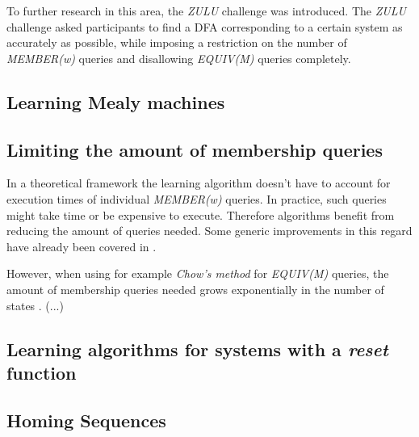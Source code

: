 \documentclass[multi,crop=false,class=article]{standalone}
\begin{document}
To further research in this area, the \textit{ZULU} challenge was introduced.
The \textit{ZULU} challenge asked participants to find a DFA corresponding
to a certain system as accurately as possible, while imposing a restriction
on the number of \textit{MEMBER(w)} queries and disallowing \textit{EQUIV(M)}
queries completely.

\subsection{Learning Mealy machines}

\subsection{Limiting the amount of membership queries}
In a theoretical framework the learning algorithm doesn't have to account
for execution times of individual \textit{MEMBER(w)} queries.
In practice, such queries might take time or be expensive to execute.
Therefore algorithms benefit from reducing the amount of queries needed.
Some generic improvements in this regard have already been covered in
.

However, when using for example \textit{Chow's method} for \textit{EQUIV(M)}
queries, the amount of membership queries needed grows exponentially
in the number of states .
(...)

\subsection{Learning algorithms for systems with a \textit{reset} function}

\subsection{Homing Sequences}
\end{document}
